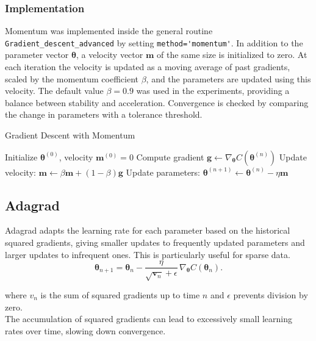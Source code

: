 \documentclass[
 reprint,            %
 amsmath,amssymb,
 aps,
]{revtex4-2}
\begin{document}
\subsubsection{Implementation}

Momentum was implemented inside the general routine \verb|Gradient_descent_advanced| by setting \verb|method='momentum'|. In addition to the parameter vector $\boldsymbol{\theta}$, a velocity vector $\mathbf{m}$ of the same size is initialized to zero. At each iteration the velocity is updated as a moving average of past gradients, scaled by the momentum coefficient $\beta$, and the parameters are updated using this velocity.
The default value $\beta=0.9$ was used in the experiments, providing a balance between stability and acceleration. Convergence is checked by comparing the change in parameters with a tolerance threshold.
\begin{algorithm}[H]
\caption{Gradient Descent with Momentum}
\begin{algorithmic}[1]
\State Initialize $\boldsymbol{\theta}^{(0)}$, velocity $\mathbf{m}^{(0)}=0$
\State Compute gradient $\mathbf{g} \gets \nabla_{\boldsymbol{\theta}} C(\boldsymbol{\theta}^{(n)})$
\State Update velocity: $\mathbf{m} \gets \beta \mathbf{m} + (1-\beta)\mathbf{g}$
\State Update parameters: $\boldsymbol{\theta}^{(n+1)} \gets \boldsymbol{\theta}^{(n)} - \eta \mathbf{m}$
\EndFor
\end{algorithmic}
\end{algorithm}

\subsection{Adagrad}

Adagrad adapts the learning rate for each parameter based on the historical squared gradients, giving smaller updates to frequently updated parameters and larger updates to infrequent ones\cite{hjorthjensen_week37}.
This is particularly useful for sparse data.  
\[
\boldsymbol{\theta}_{n+1} = \boldsymbol{\theta}_n - \frac{\eta}{\sqrt{\boldsymbol{v}_n} + \epsilon} \, \nabla_{\boldsymbol{\theta}} C(\boldsymbol{\theta}_n).
\]

where \(v_n\) is the sum of squared gradients up to time \(n\) and \(\epsilon\) prevents division by zero.  \\

The accumulation of squared gradients can lead to excessively small learning rates over time, slowing down convergence. \cite{goodfellow2016}
\end{document}
